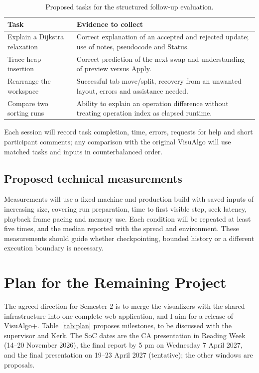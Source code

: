 \documentclass[11pt,a4paper]{article}
\begin{document}
\begin{table}[tbp]\small\centering
\caption{Proposed tasks for the structured follow-up evaluation.}\label{tab:tasks}
\begin{tabularx}{\linewidth}{@{}>{\raggedright\arraybackslash}p{41mm}X@{}}\toprule
Task & Evidence to collect\\\midrule
Explain a Dijkstra relaxation & Correct explanation of an accepted and rejected update; use of notes, pseudocode and Status.\\
Trace heap insertion & Correct prediction of the next swap and understanding of preview versus Apply.\\
Rearrange the workspace & Successful tab move/split, recovery from an unwanted layout, errors and assistance needed.\\
Compare two sorting runs & Ability to explain an operation difference without treating operation index as elapsed runtime.\\\bottomrule
\end{tabularx}
\end{table}

Each session will record task completion, time, errors, requests for help and short participant comments; any comparison with the original VisuAlgo will use matched tasks and inputs in counterbalanced order.

\subsection{Proposed technical measurements}
Measurements will use a fixed machine and production build with saved inputs of increasing size, covering run preparation, time to first visible step, seek latency, playback frame pacing and memory use. Each condition will be repeated at least five times, and the median reported with the spread and environment. These measurements should guide whether checkpointing, bounded history or a different execution boundary is necessary.

\par\vspace{6pt}
\section{Plan for the Remaining Project}\label{sec:plan}
The agreed direction for Semester 2 is to merge the visualizers with the shared infrastructure into one complete web application, and I aim for a release of VisuAlgo+. Table~\ref{tab:plan} proposes milestones, to be discussed with the supervisor and Kerk. The SoC dates are the CA presentation in Reading Week (14--20 November 2026), the final report by 5 pm on Wednesday 7 April 2027, and the final presentation on 19--23 April 2027 (tentative); the other windows are proposals.
\end{document}
